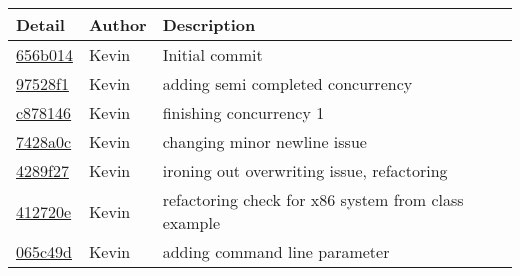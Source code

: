 \begin{tabular}{l l p{1.5in}}\textbf{Detail} & \textbf{Author} & \textbf{Description}\\\hline
\href{https://github.com/zainkai/CS444/commit/656b01413d4a0d6a900bc7b9a0ee7f31c3aa0977}{656b014} & Kevin & Initial commit\\\hline
\href{https://github.com/zainkai/CS444/commit/97528f1aee1791321dbb945b726b4e500ae66f08}{97528f1} & Kevin & adding semi completed concurrency\\\hline
\href{https://github.com/zainkai/CS444/commit/c878146c0d3bed1cf35b2a62476989512c8ee485}{c878146} & Kevin & finishing concurrency 1\\\hline
\href{https://github.com/zainkai/CS444/commit/7428a0c6b8fda45aeb446f3401a300840503d9a1}{7428a0c} & Kevin & changing minor newline issue\\\hline
\href{https://github.com/zainkai/CS444/commit/4289f2779b8c817314c13505d6d29c3419ae6959}{4289f27} & Kevin & ironing out overwriting issue, refactoring\\\hline
\href{https://github.com/zainkai/CS444/commit/412720e478f97e598bd7784c140048e3e393d203}{412720e} & Kevin & refactoring check for x86 system from class example\\\hline
\href{https://github.com/zainkai/CS444/commit/065c49da4c076338f8b9ef4d20cf2171f400e988}{065c49d} & Kevin & adding command line parameter\\\hline
\end{tabular}
